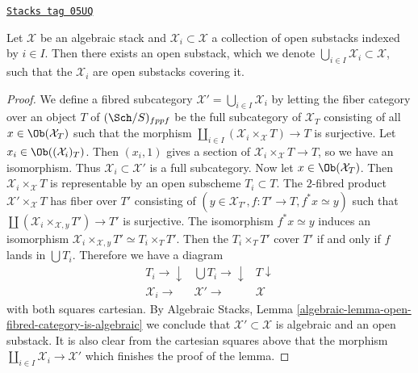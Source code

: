 \begin{lemma}
\label{stacks-properties-lemma-union-open-substacks}
\href{https://stacks.math.columbia.edu/tag/05UQ}{\texttt{Stacks tag 05UQ}}

Let $\mathcal X$ be an algebraic stack and $\mathcal{X}_i \subset \mathcal X$
a collection of open substacks indexed by $i \in I$. Then there exists an
open substack, which we denote
$\bigcup_{i\in I} \mathcal{X}_i \subset \mathcal X$, such that
the $\mathcal{X}_i$ are open substacks covering it.
\end{lemma}

\begin{proof}
We define a fibred subcategory
$\mathcal{X}' = \bigcup_{i \in I} \mathcal{X}_i$
by letting the fiber category over an object $T$ of $(\Sch/S)_{fppf}$
be the full subcategory of $\mathcal{X}_T$ consisting of all
$x \in \Ob(\mathcal{X}_T)$ such that the morphism
$\coprod_{i \in I} (\mathcal{X}_i \times_{\mathcal X} T) \to T$
is surjective. Let $x_i \in \Ob((\mathcal{X}_i)_T)$.
Then $(x_i, 1)$ gives a section of
$\mathcal{X}_i \times_{\mathcal X} T \to T$, so we have an isomorphism. Thus
$\mathcal{X}_i \subset \mathcal{X}'$ is a full subcategory.
Now let $x \in \Ob(\mathcal{X}_T)$. Then
$\mathcal{X}_i \times_{\mathcal X} T$ is representable
by an open subscheme $T_i \subset T$. The $2$-fibred product
$\mathcal{X}' \times_{\mathcal X} T$ has fiber over $T'$ consisting
of $(y \in \mathcal{X}_{T'}, f : T' \to T, f^*x \simeq y)$ such that
$\coprod (\mathcal{X}_i \times_{\mathcal X, y} T') \to T'$ is surjective.
The isomorphism $f^*x \simeq y$ induces an isomorphism
$\mathcal{X}_i \times_{\mathcal X, y} T' \simeq T_i \times_T T'$.
Then the $T_i \times_T T'$ cover $T'$ if and only if $f$ lands in
$\bigcup T_i$. Therefore we have a diagram
$$
\begin{array}{ccc}T_i \longrightarrow\downarrow & \bigcup T_i \longrightarrow\downarrow & T \downarrow \\ \mathcal{X}_i \longrightarrow & \mathcal{X}' \longrightarrow & \mathcal{X}\end{array}
$$
with both squares cartesian. By
Algebraic Stacks, Lemma \ref{algebraic-lemma-open-fibred-category-is-algebraic}
we conclude that $\mathcal{X'} \subset \mathcal{X}$ is algebraic and an
open substack. It is also clear from the cartesian squares above that the
morphism $\coprod_{i \in I} \mathcal{X}_i \to \mathcal{X}'$ which
finishes the proof of the lemma.
\end{proof}


